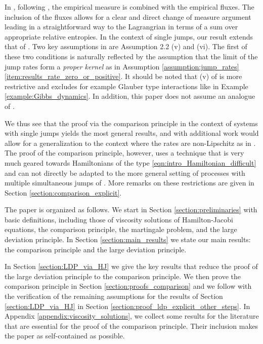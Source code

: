 \documentclass[a4paper]{article}
\numberwithin{equation}{section}
\theoremstyle{definition}
\begin{document}
In \cite{PaRe19}, following \cite{Re18}, the empirical measure is combined with the empirical fluxes. The inclusion of the fluxes allows for a clear and direct change of measure argument leading in a straightforward way to the Lagrangrian in terms of a sum over appropriate relative entropies. In the context of single jumps, our result extends that of \cite{PaRe19}. Two key assumptions in \cite{PaRe19} are Assumption 2.2 (v) and (vi). The first of these two conditions is naturally reflected by the assumption that the limit of the jump rates form a \textit{proper kernel} as in Assumption \ref{assumption:jump_rates} \ref{item:results_rate_zero_or_positive}. It should be noted that (v) of \cite{PaRe19} is more restrictive and excludes for example Glauber type interactions like in Example \ref{example:Gibbs_dynamics}. In addition, this paper does not assume an analogue of \cite[Assumption 2.2 (vi)]{PaRe19}.

\smallskip

We thus see that the proof via the comparison principle in the context of systems with single jumps yields the most general results, and with additional work would allow for a generalization to the context where the rates are non-Lipschitz as in \cite{Kr16b}. The proof of the comparison principle, however, uses a technique that is very much geared towards Hamiltonians of the type \eqref{eqn:intro_Hamiltonian_difficult} and can not directly be adapted to the more general setting of processes with multiple simultaneous jumps of \cite{DuRaWu16,PaRe19}.  More remarks on these restrictions are given in Section \ref{section:comparison_explicit}.


\smallskip

The paper is organized as follows. We start in Section \ref{section:preliminaries} with basic definitions, including those of viscosity solutions of Hamilton-Jacobi equations, the comparison principle, the martingale problem, and the large deviation principle.  In Section \ref{section:main_results} we state our main results: the comparison principle and the large deviation principle. 

In Section \ref{section:LDP_via_HJ} we give the key results that reduce the proof of the large deviation principle to the comparison principle. We then prove the comparison principle in Section \ref{section:proofs_comparison} and we follow with the verification of the remaining assumptions for the results of Section \ref{section:LDP_via_HJ} in Section \ref{section:proof_ldp_explicit_other_steps}. In Appendix \ref{appendix:viscosity_solutions}, we collect some results for the literature that are essential for the proof of the comparison principle. Their inclusion makes the paper as self-contained as possible.
\end{document}
